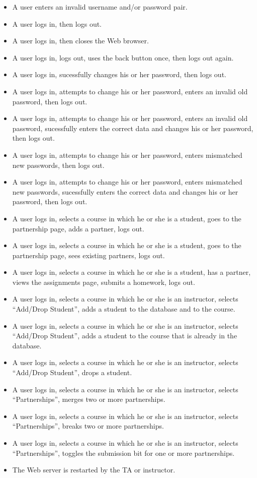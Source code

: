 \documentclass[a4paper]{article}
\begin{document}
\begin{itemize}
  \item{A user enters an invalid username and/or password pair.}
  \item{A user logs in, then logs out.}
  \item{A user logs in, then closes the Web browser.}
  \item{A user logs in, logs out, uses the back button once, then logs out
    again.}
  \item{A user logs in, sucessfully changes his or her password, then logs out.}
  \item{A user logs in, attempts to change his or her password, enters an
    invalid old password, then logs out.}
  \item{A user logs in, attempts to change his or her password, enters an
    invalid old password, sucessfully enters the correct data and changes his
    or her password, then logs out.}
  \item{A user logs in, attempts to change his or her password, enters
    mismatched new passwords, then logs out.}
  \item{A user logs in, attempts to change his or her password, enters
    mismatched new passwords, sucessfully enters the correct data and changes
    his or her password, then logs out.}
  \item{A user logs in, selects a course in which he or she is a student, goes
    to the partnership page, adds a partner, logs out.}
  \item{A user logs in, selects a course in which he or she is a student, goes
    to the partnership page, sees existing partners, logs out.}
  \item{A user logs in, selects a course in which he or she is a student, has a
    partner, views the assignments page, submits a homework, logs out.}
  \item{A user logs in, selects a course in which he or she is an instructor,
    selects ``Add/Drop Student'', adds a student to the database and to the
    course.}
  \item{A user logs in, selects a course in which he or she is an instructor,
    selects ``Add/Drop Student'', adds a student to the course that is already
    in the database.}
  \item{A user logs in, selects a course in which he or she is an instructor,
    selects ``Add/Drop Student'', drops a student.}
  \item{A user logs in, selects a course in which he or she is an instructor,
    selects ``Partnerships'', merges two or more partnerships.}
  \item{A user logs in, selects a course in which he or she is an instructor,
    selects ``Partnerships'', breaks two or more partnerships.}
  \item{A user logs in, selects a course in which he or she is an instructor,
    selects ``Partnerships'', toggles the submission bit for one or more
    partnerships.}
  \item{The Web server is restarted by the TA or instructor.}
\end{itemize}
\end{document}
